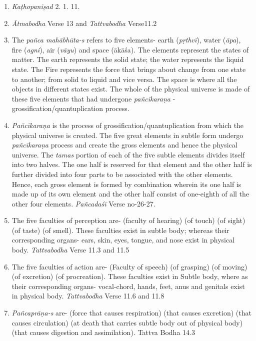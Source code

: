 \begin{enumerate}
\itemsep=0pt
\item
  \emph{Kaṭhopaniṣad} 2. 1. 11.
\item
  \emph{Ātmabodha} Verse 13 and \emph{Tattvabodha} Verse11.2
\item
  The \emph{pañca mahābhūta-s} refers to five elements- earth (\emph{pṛthvī}), water (\emph{āpa}), fire (\emph{agni}), air (\emph{vāyu}) and space (ākāśa). The elements represent the states of matter. The earth represents the solid state; the water represents the liquid state. The Fire represents the force that brings about change from one state to another; from solid to liquid and vice versa. The space is where all the objects in different states exist. The whole of the physical universe is made of these five elements that had undergone \emph{pañcīkaraṇa} - grossification/quantuplication process.
\item
  \emph{Pañcīkaraṇa} is the process of grossification/quantuplication from which the physical universe is created. The five great elements in subtle form undergo \emph{pañcīkaraṇa} process and create the gross elements and hence the physical universe. The \emph{tamas} portion of each of the five subtle elements divides itself into two halves. The one half is reserved for that element and the other half is further divided into four parts to be associated with the other elements. Hence, each gross element is formed by combination wherein its one half is made up of its own element and the other half consist of one-eighth of all the other four elements. \emph{Pañcadaśī} Verse no-26-27.
\item
  The five faculties of perception are-  (faculty of hearing)  (of touch)  (of sight)  (of taste)  (of smell). These faculties exist in subtle body; whereas their corresponding organs- ears, skin, eyes, tongue, and nose exist in physical body. \emph{Tattvabodha} Verse 11.3 and 11.5
\item
  The five faculties of action are-  (Faculty of speech)  (of grasping)  (of moving)  (of excretion)  (of procreation). These faculties exist in Subtle body, where as their corresponding organs- vocal-chord, hands, feet, anus and genitals exist in physical body. \emph{Tattvabodha} Verse 11.6 and 11.8
\item
  \emph{Pañcaprāṇa-s} are-  (force that causes respiration)  (that causes excretion)  (that causes circulation)  (at death that carries subtle body out of physical body)  (that causes digestion and assimilation). Tattva Bodha 14.3

\end{enumerate}

